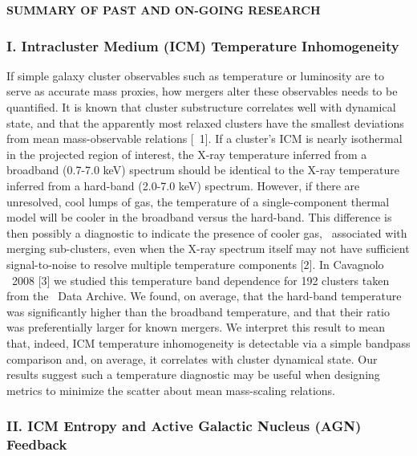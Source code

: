 \documentclass[letterpaper,12pt]{article}
\begin{document}
\begin{center}
  {\bf\uppercase{Summary of Past and On-going Research}}
\end{center}

\subsubsection*{I. Intracluster Medium (ICM) Temperature Inhomogeneity}

If simple galaxy cluster observables such as temperature or luminosity
are to serve as accurate mass proxies, how mergers alter these
observables needs to be quantified. It is known that cluster
substructure correlates well with dynamical state, and that the
apparently most relaxed clusters have the smallest deviations from
mean mass-observable relations [\eg\ 1]. If a cluster's ICM is nearly
isothermal in the projected region of interest, the X-ray temperature
inferred from a broadband (0.7-7.0 keV) spectrum should be identical
to the X-ray temperature inferred from a hard-band (2.0-7.0 keV)
spectrum. However, if there are unresolved, cool lumps of gas, the
temperature of a single-component thermal model will be cooler in the
broadband versus the hard-band. This difference is then possibly a
diagnostic to indicate the presence of cooler gas, \eg\ associated
with merging sub-clusters, even when the X-ray spectrum itself may not
have sufficient signal-to-noise to resolve multiple temperature
components [2]. In Cavagnolo \etal\ 2008 [3] we studied this
temperature band dependence for 192 clusters taken from the
\chandra\ Data Archive. We found, on average, that the hard-band
temperature was significantly higher than the broadband temperature,
and that their ratio was preferentially larger for known mergers. We
interpret this result to mean that, indeed, ICM temperature
inhomogeneity is detectable via a simple bandpass comparison and, on
average, it correlates with cluster dynamical state. Our results
suggest such a temperature diagnostic may be useful when designing
metrics to minimize the scatter about mean mass-scaling relations.

\subsubsection*{II. ICM Entropy and Active Galactic Nucleus (AGN) Feedback}
\end{document}
